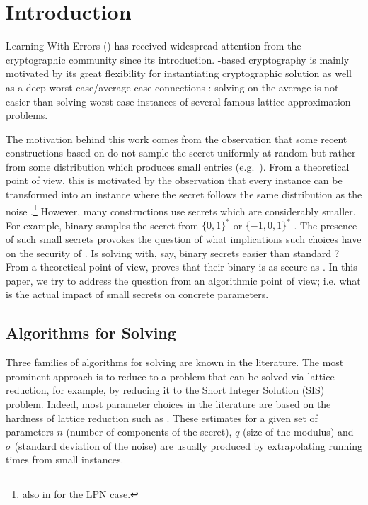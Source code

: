 \section{Introduction} \label{sec:intro}
Learning With Errors (\LWE) \cite{regev:acm09} has received  widespread attention from the cryptographic community since its introduction. \LWE-based cryptography is mainly motivated by its great flexibility for instantiating cryptographic solution as well as a deep worst-case/average-case connections \cite{regev:acm09}: solving \LWE{} on the average is not easier than solving worst-case instances of several famous lattice approximation problems.

The motivation behind this work comes from the observation that some recent constructions based on \LWE do not sample the secret uniformly at random but rather from some distribution which produces small entries (e.g.\ \cite{applebaum-cash-peikert-sahai:crypto2009,DBLP:conf/tcc/AkaviaGV09,DBLP:conf/innovations/GoldwasserKPV10,gentry-halevi-smart:crypto2012,DBLP:conf/tcc/Pietrzak12}). From a theoretical point of view, this is motivated by the observation that every \LWE instance can be transformed into an instance where the secret follows the same distribution as the noise \cite{applebaum-cash-peikert-sahai:crypto2009}.\footnote{also in \cite{kirchner:eprint2011} for the LPN case.} However, many constructions use secrets which are considerably smaller.
For example, binary-\LWE samples the secret from $\{0,1\}^*$ \cite{brakerski-langlois-peikert-regev-stehle:stoc13} or $\{-1,0,1\}^*$ \cite{gentry-halevi-smart:crypto2012}. The presence of such small secrets provokes the question of what implications such choices have on the security of \LWE. Is solving \LWE with, say, binary secrets easier than standard \LWE? From a theoretical point of view, \cite{brakerski-langlois-peikert-regev-stehle:stoc13} proves that their binary-\LWE is as secure as \LWE{}. In this paper, we try to address the question from an algorithmic point of view; i.e. what is the actual impact of small secrets on concrete parameters.    

\subsection{Algorithms for Solving \LWE}
Three families of algorithms for solving \LWE are known in the literature. The most prominent approach is to reduce \LWE to a problem that can be solved via lattice reduction, for example, by reducing it to the Short Integer Solution (SIS) problem. Indeed, most parameter choices in the literature are based on the hardness of lattice reduction such as \cite{LindnerP10,chen-nguyen:asiacrypt2011,liu-nguyen:ctrsa2013}. These estimates for a given set of parameters $n$ (number of components of the secret), $q$ (size of the modulus) and  $\sigma$ (standard deviation of the noise) are usually produced by extrapolating running times from small instances.

